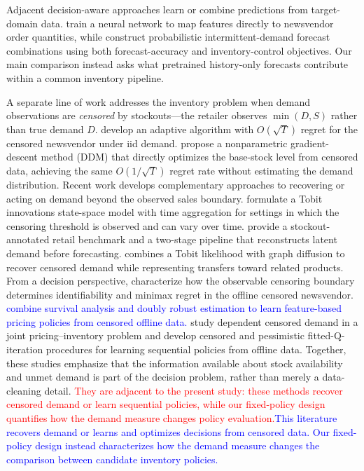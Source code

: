 \documentclass[msom,dblanonrev]{informs4}
\newcommand{\add}[1]{\textcolor{blue}{#1}}
\newcommand{\reduce}[1]{\textcolor{red}{#1}\hspace{0.5em}}
\begin{document}
Adjacent decision-aware approaches learn or combine predictions from target-domain data.
\citet{OroojlooyjadidEtAl2020} train a neural network to map features directly to newsvendor order quantities, while \citet{WangKangPetropoulos2024} construct probabilistic intermittent-demand forecast combinations using both forecast-accuracy and inventory-control objectives.
Our main comparison instead asks what pretrained history-only forecasts contribute within a common inventory pipeline.

A separate line of work addresses the inventory problem when demand observations are \emph{censored} by stockouts---the retailer observes $\min(D, S)$ rather than true demand $D$.
\citet{HuhRusmevichientong2009} develop an adaptive algorithm with $O(\sqrt{T})$ regret for the censored newsvendor under iid demand.
\citet{ShiChenDuenyas2016} propose a nonparametric gradient-descent method (DDM) that directly optimizes the base-stock level from censored data, achieving the same $O(1/\sqrt{T})$ regret rate without estimating the demand distribution.
Recent work develops complementary approaches to recovering or acting on demand beyond the observed sales boundary.
\citet{PedregalTrapero2024} formulate a Tobit innovations state-space model with time aggregation for settings in which the censoring threshold is observed and can vary over time.
\citet{WangEtAl2025FreshRetail} provide a stockout-annotated retail benchmark and a two-stage pipeline that reconstructs latent demand before forecasting.
\citet{Rodrigues2025DiffusionAware} combines a Tobit likelihood with graph diffusion to recover censored demand while representing transfers toward related products.
From a decision perspective, \citet{HssaineSinclair2024} characterize how the observable censoring boundary determines identifiability and minimax regret in the offline censored newsvendor.
\add{\citet{TangEtAl2025} combine survival analysis and doubly robust estimation to learn feature-based pricing policies from censored offline data.}
\citet{GundemQi2025} study dependent censored demand in a joint pricing--inventory problem and develop censored and pessimistic fitted-Q-iteration procedures for learning sequential policies from offline data.
Together, these studies emphasize that the information available about stock availability and unmet demand is part of the decision problem, rather than merely a data-cleaning detail.
\reduce{They are adjacent to the present study: these methods recover censored demand or learn sequential policies, while our fixed-policy design quantifies how the demand measure changes policy evaluation.}\add{This literature recovers demand or learns and optimizes decisions from censored data. Our fixed-policy design instead characterizes how the demand measure changes the comparison between candidate inventory policies.}
\end{document}
